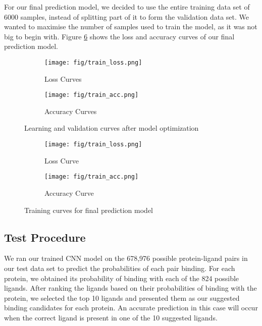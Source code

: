 \documentclass[11pt]{article}
\begin{document}
For our final prediction model, we decided to use the entire training data set of 6000 samples, instead of splitting part of it to form the validation data set. We wanted to maximise the number of samples used to train the model, as it was not big to begin with. Figure \ref{fig:final_curves} shows the loss and accuracy curves of our final prediction model.

\begin{figure}[htb]
     \centering
     \begin{subfigure}[t]{0.49\textwidth}
         \texttt{[image: fig/train\_loss.png]}
         \caption{Loss Curves}
         \label{fig:train_loss}
     \end{subfigure}
     \hfill
     \begin{subfigure}[t]{0.49\textwidth}
         \texttt{[image: fig/train\_acc.png]}
         \caption{Accuracy Curves}
         \label{fig:train_acc}
     \end{subfigure}

    \caption{Learning and validation curves after model optimization}
    \label{fig:train_curves}
\end{figure}

\begin{figure}[htb]
     \centering
     \begin{subfigure}[t]{0.49\textwidth}
         \texttt{[image: fig/train\_loss.png]}
         \caption{Loss Curve}
         \label{fig:final_loss}
     \end{subfigure}
     \hfill
     \begin{subfigure}[t]{0.49\textwidth}
         \texttt{[image: fig/train\_acc.png]}
         \caption{Accuracy Curve}
         \label{fig:final_acc}
     \end{subfigure}

    \caption{Training curves for final prediction model}
    \label{fig:final_curves}
\end{figure}

\subsection{Test Procedure}
We ran our trained CNN model on the 678,976 possible protein-ligand pairs in our test data set to predict the probabilities of each pair binding. For each protein, we obtained its probability of binding with each of the 824 possible ligands. After ranking the ligands based on their probabilities of binding with the protein, we selected the top 10 ligands and presented them as our suggested binding candidates for each protein. An accurate prediction in this case will occur when the correct ligand is present in one of the 10 suggested ligands.
\end{document}
